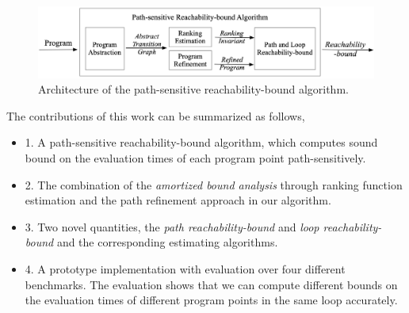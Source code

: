 \begin{figure}
\centering
\includegraphics[width=1.0\columnwidth]{psRB-architecture.png}
\caption{Architecture of the path-sensitive reachability-bound algorithm.}
\label{fig:psRB-architecture}
\end{figure}
The contributions of this work can be summarized as follows,
\begin{itemize}
  \item 
  1. A path-sensitive reachability-bound algorithm, which computes sound bound on the evaluation times of each program point path-sensitively.
  \item 
  2. The combination of the \emph{amortized bound analysis} through ranking function estimation and the path refinement approach in our algorithm.
  \item 
  3. Two novel quantities, the \emph{path reachability-bound} and \emph{loop reachability-bound} and the corresponding estimating algorithms.
  \item 
  4. A prototype implementation with evaluation over four different benchmarks.
  The evaluation shows that we can compute different bounds on the evaluation times of different program points in the same loop accurately.
\end{itemize}